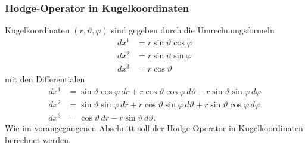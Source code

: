 \subsubsection{Hodge-Operator in Kugelkoordinaten}
%
Kugelkoordinaten $(r,\vartheta,\varphi)$ sind gegeben durch die
Umrechnungsformeln
\begin{equation}
\begin{aligned}
dx^1 &= r \sin\vartheta \cos\varphi \\
dx^2 &= r \sin\vartheta \sin\varphi \\
dx^3 &= r \cos\vartheta
\end{aligned}
\label{buch:hodge:skalarprodukt:eqn:kugelkoordinaten}
\end{equation}
mit den Differentialen
\begin{align*}
dx^1
&=
\sin\vartheta \cos\varphi \,dr
+
r \cos\vartheta \cos\varphi \,d\vartheta
-
r \sin\vartheta \sin\varphi \,d\varphi
\\
dx^2
&=
\sin\vartheta \sin\varphi \,dr
+
r \cos\vartheta \sin\varphi \,d\vartheta
+
r \sin\vartheta \cos\varphi \,d\varphi
\\
dx^3
&=
\cos\vartheta\,dr
-
r \sin\vartheta\,d\vartheta.
\end{align*}
Wie im vorangegangenen Abschnitt soll der Hodge-Operator in
Kugelkoordinaten berechnet werden.
